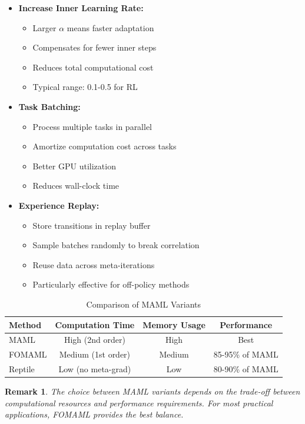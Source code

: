 \documentclass[12pt]{article}
\newtheorem{remark}{Remark}
\begin{document}
{{\begin{enumerate}
				\begin{itemize}
					\item \textbf{Increase Inner Learning Rate:}
					\begin{itemize}
						\item Larger $\alpha$ means faster adaptation
						\item Compensates for fewer inner steps
						\item Reduces total computational cost
						\item Typical range: 0.1-0.5 for RL
					\end{itemize}
					
					\item \textbf{Task Batching:}
					\begin{itemize}
						\item Process multiple tasks in parallel
						\item Amortize computation cost across tasks
						\item Better GPU utilization
						\item Reduces wall-clock time
					\end{itemize}
					
					\item \textbf{Experience Replay:}
					\begin{itemize}
						\item Store transitions in replay buffer
						\item Sample batches randomly to break correlation
						\item Reuse data across meta-iterations
						\item Particularly effective for off-policy methods
					\end{itemize}
				\end{itemize}
			\end{enumerate}
			
			\begin{table}[H]
			\centering
			\caption{Comparison of MAML Variants}
			\begin{tabular}{@{}lccc@{}}
			\toprule
			\textbf{Method} & \textbf{Computation Time} & \textbf{Memory Usage} & \textbf{Performance} \\
			\midrule
			MAML & High (2nd order) & High & Best \\
			FOMAML & Medium (1st order) & Medium & 85-95\% of MAML \\
			Reptile & Low (no meta-grad) & Low & 80-90\% of MAML \\
			\bottomrule
			\end{tabular}
			\label{tab:maml_variants}
			\end{table}
			
			\begin{remark}
			The choice between MAML variants depends on the trade-off between computational resources and performance requirements. For most practical applications, FOMAML provides the best balance.
			\end{remark}
			
	}}
	
\end{document}
